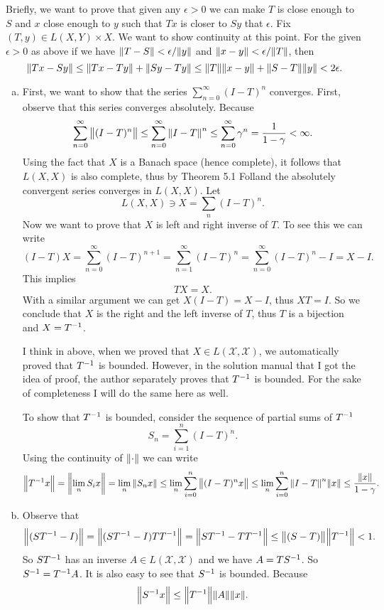 \begin{problem}[Folland: Ch5, P4]
	Briefly, we want to prove that given any $ \epsilon>0 $ we can make $ T $ is close enough to $ S $ and $ x $ close enough to $ y $ such that $ Tx $ is closer to $ Sy $ that $ \epsilon $.
	Fix $ (T,y) \in L(X,Y)\times X $. We want to show continuity at this point. For the given $ \epsilon>0 $ as above if we have $ \norm{T-S} < \epsilon/\norm{y} $ and $ \norm{x-y} <\epsilon/\norm{T} $, then 
	\[ \norm{Tx - Sy} \leq \norm{Tx-Ty} + \norm{Sy-Ty} \leq \norm{T}\norm{x-y} + \norm{S-T}\norm{y} < 2\epsilon.  \] 
\end{problem}


\begin{problem}[Folland: Ch5, P7]
	\begin{solution}
		\begin{enumerate}[(a)]
			\item First, we want to show that the series $ \sum_{n=0}^\infty (I-T)^n  $ converges. First, observe that this series converges absolutely. Because
			\[ \sum_{n=0}^\infty \norm{(I-T)^n} \leq \sum_{n=0}^\infty \norm{I-T}^n  \leq \sum_{n=0}^{\infty} \gamma^n = \frac{1}{1-\gamma} < \infty. \]
			Using the fact that $ X $ is a Banach space (hence complete), it follows that $ L(X,X) $ is also complete, thus by Theorem 5.1 Folland the absolutely convergent series converges in $ L(X,X) $. Let 
			\[ L(X,X) \ni X = \sum_n (I-T)^n. \]
			Now we want to prove that $ X $ is left and right inverse of $ T $. To see this we can write
			\[ (I-T)X = \sum_{n=0}^\infty (I-T)^{n+1} = \sum_{n=1}^{\infty} (I-T)^n = \sum_{n=0}^{\infty} (I-T)^n - I = X-I. \]
			This implies
			\[ TX = X. \]
			With a similar argument we can get $ X(I-T) = X-I $, thus $ XT = I $. So we conclude that $ X $ is the right and the left inverse of $ T $, thus $ T $ is a bijection and $ X = T^{-1} $.
			\begin{remark}
				I think in above, when we proved that $ X \in L(\mathcal{X},\mathcal{X}) $, we automatically proved that $ T^{-1} $ is bounded. However, in the solution manual that I got the idea of proof, the author separately proves that $ T^{-1} $ is bounded. For the sake of completeness I will do the same here as well.
			\end{remark}
			To show that $ T^{-1} $ is bounded, consider the sequence of partial sums of $ T^{-1} $
			\[ S_n = \sum_{i=1}^n (I-T)^n. \]
			Using the continuity of $ \norm{\cdot} $ we can write
			\[ \norm{T^{-1}x} = \norm{\lim_{n} S_i x} = \lim_{n} \norm{S_n x} \leq \lim_n \sum_{i=0}^n \norm{(I-T)^nx} \leq \lim_n \sum_{i=0}^n \norm{I-T}^n \norm{x} \leq \frac{\norm{x}}{1-\gamma}. \]
			
			\item Observe that 
			\[ \norm{(ST^{-1} - I)} = \norm{(ST^{-1}-I)TT^{-1}} = \norm{ST^{-1} - TT^{-1}} \leq \norm{(S-T)}\norm{T^{-1}} < 1. \]
			So $ ST^{-1} $ has an inverse $ A \in L(\mathcal{X},\mathcal{X}) $ and we have $ A = TS^{-1} $. So $ S^{-1} = T^{-1}A $. It is also easy to see that $ S^{-1} $ is bounded. Because
			\[ \norm{S^{-1}x} \leq \norm{T^{-1}}\norm{A}\norm{x}. \]
		\end{enumerate}
		
	\end{solution}
\end{problem}